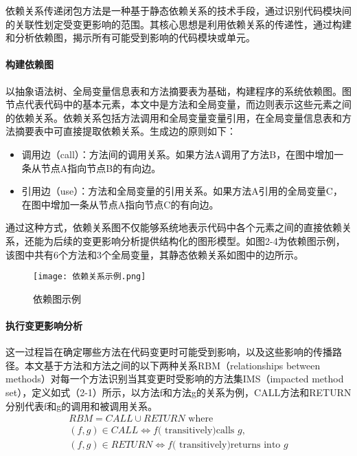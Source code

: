 依赖关系传递闭包方法是一种基于静态依赖关系的技术手段，通过识别代码模块间的关联性划定受变更影响的范围\cite{2021Improving}。其核心思想是利用依赖关系的传递性，通过构建和分析依赖图，揭示所有可能受到影响的代码模块或单元。

\paragraph{构建依赖图}

以抽象语法树、全局变量信息表和方法摘要表为基础，构建程序的系统依赖图。图节点代表代码中的基本元素，本文中是方法和全局变量，而边则表示这些元素之间的依赖关系。依赖关系包括方法调用和全局变量变量引用，在全局变量信息表和方法摘要表中可直接提取依赖关系。生成边的原则如下：
\begin{itemize}
    \item 调用边（call）：方法间的调用关系。如果方法A调用了方法B，在图中增加一条从节点A指向节点B的有向边。
    
    \item 引用边（use）：方法和全局变量的引用关系。如果方法A引用的全局变量C，在图中增加一条从节点A指向节点C的有向边。
\end{itemize}

通过这种方式，依赖关系图不仅能够系统地表示代码中各个元素之间的直接依赖关系，还能为后续的变更影响分析提供结构化的图形模型。如图2-4为依赖图示例，该图中共有6个方法和3个全局变量，其静态依赖关系如图中的边所示。

\begin{figure}[h]
    \centering
    \texttt{[image: 依赖关系示例.png]}
    \caption{依赖图示例}
    \end{figure}

\paragraph{执行变更影响分析}

这一过程旨在确定哪些方法在代码变更时可能受到影响，以及这些影响的传播路径。本文基于方法和方法之间的以下两种关系RBM（relationships between methods）对每一个方法识别当其变更时受影响的方法集IMS（impacted method set），定义如式（2-1）所示，以方法f和方法g的关系为例，CALL方法和RETURN分别代表f和g的调用和被调用关系。
\begin{equation}
\begin{array}{l}
R B M=C A L L \cup R E T U R N \text { where } \\
(f, g) \in C A L L \Longleftrightarrow f(\text { transitively)calls } g, \\
(f, g) \in R E T U R N \Longleftrightarrow f(\text { transitively)returns into } g
\end{array}
\end{equation}

